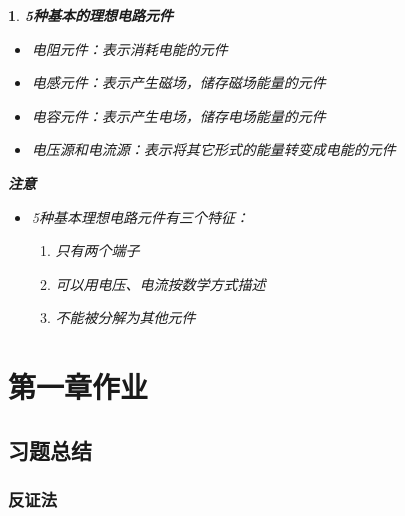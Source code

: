 \documentclass[UTF8]{report}
\theoremstyle{MyLineTheoremStyle} %
\theoremstyle{MyBlockTheoremStyle} %
\theoremstyle{MySubsubsectionStyle} %
\newtheorem{definition}{}
\begin{document}
\begin{definition}
    \textbf{5种基本的理想电路元件}
    \begin{itemize}
        \item 电阻元件：表示消耗电能的元件
        \item 电感元件：表示产生磁场，储存磁场能量的元件
        \item 电容元件：表示产生电场，储存电场能量的元件
        \item 电压源和电流源：表示将其它形式的能量转变成电能的元件
    \end{itemize}
    \textbf{注意}
    \begin{itemize}
        \item 5种基本理想电路元件有三个特征：
        \begin{enumerate}[label=(\alph*)]
            \item 只有两个端子
            \item 可以用电压、电流按数学方式描述
            \item 不能被分解为其他元件
        \end{enumerate}
    \end{itemize}
\end{definition}

\chapter{第一章作业}\thispagestyle{fancy}

\section{习题总结}

\subsection{反证法}
\end{document}
